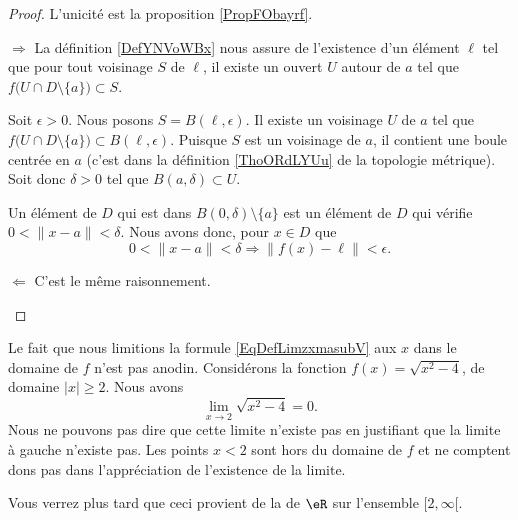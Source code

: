 \begin{proof}
	L'unicité est la proposition \ref{PropFObayrf}.

	\begin{subproof}
		\item[\( \Rightarrow\)]
		La définition \ref{DefYNVoWBx} nous assure de l'existence d'un élément \( \ell\) tel que pour tout voisinage \( S\) de \( \ell\), il existe un ouvert \( U\) autour de \( a\) tel que \( f\big( U\cap D\setminus\{ a \} \big)\subset S\).

		Soit \( \epsilon>0\). Nous posons \( S=B(\ell,\epsilon)\). Il existe un voisinage \( U\) de \( a\) tel que \( f\big( U\cap D\setminus\{ a \} \big)\subset B(\ell,\epsilon)\). Puisque \( S\) est un voisinage de \( a\), il contient une boule centrée en \( a\) (c'est dans la définition \ref{ThoORdLYUu} de la topologie métrique). Soit donc \( \delta>0\) tel que \( B(a,\delta)\subset U\).

		Un élément de \( D\) qui est dans \( B(0,\delta)\setminus \{ a \}\) est un élément de \( D\) qui vérifie \( 0<\| x-a \|<\delta\). Nous avons donc, pour \( x\in D\) que
		\begin{equation}
			0<\| x-a \|<\delta\Rightarrow \| f(x)-\ell \|<\epsilon.
		\end{equation}
		\item[\( \Leftarrow\)] C'est le même raisonnement.
	\end{subproof}
\end{proof}


\begin{remark}
	Le fait que nous limitions la formule \eqref{EqDefLimzxmasubV} aux \( x\) dans le domaine de \( f\) n'est pas anodin. Considérons la fonction \( f(x)=\sqrt{x^2-4}\), de domaine \( | x |\geq 2\). Nous avons
	\begin{equation}
		\lim_{x\to 2} \sqrt{x^2-4}=0.
	\end{equation}
	Nous ne pouvons pas dire que cette limite n'existe pas en justifiant que la limite à gauche n'existe pas. Les points \( x<2\) sont hors du domaine de \( f\) et ne comptent dons pas dans l'appréciation de l'existence de la limite.

	Vous verrez plus tard que ceci provient de la  de \( \eR\) sur l'ensemble \( \mathopen[ 2 , \infty [\).
\end{remark}

